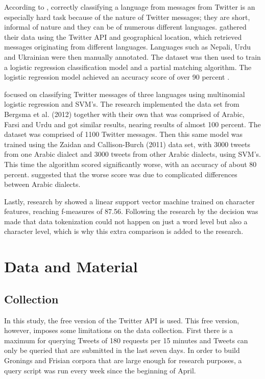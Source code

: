 \documentclass[
10pt, %
a4paper, %
oneside, %
headinclude,footinclude, %
] {book}%
\begin{document}
According to \citet{bergsma}, correctly classifying a language from messages from Twitter is an especially hard task because of the nature of Twitter messages; they are short, informal of nature and they can be of numerous different languages. \citet{bergsma} gathered their data using the Twitter API and geographical location, which retrieved messages originating from different languages. Languages such as Nepali, Urdu and Ukrainian were then manually annotated. The dataset was then used to train a logistic regression classification model and a partial matching algorithm. The logistic regression model achieved an accuracy score of over 90 percent \citep{bergsma}.

\citet{Tratz} focused on classifying Twitter messages of three languages using multinomial logistic regression and SVM's. The research implemented the data set from Bergsma et al. (2012) together with their own that was comprised of Arabic, Farsi and Urdu and got similar results, nearing results of almost 100 percent. The dataset was comprised of 1100 Twitter messages. Then this same model was trained using the Zaidan and Callison-Burch (2011) data set, with 3000 tweets from one Arabic dialect and 3000 tweets from other Arabic dialects, using SVM's. This time the algorithm scored significantly worse, with an accuracy of about 80 percent. \citet{Tratz} suggested that the worse score was due to complicated differences between Arabic dialects.

Lastly, research by \citet{Wieling} showed a linear support vector machine trained on character features, reaching f-measures of 87.56. Following the research by \citet{Wieling} the decision was made that data tokenization could not happen on just a word level but also a character level, which is why this extra comparison is added to the research.


\chapter{Data and Material}

\section{Collection} 
In this study,  the free version of the Twitter API is used. This free version, however, imposes some limitations on the data collection. First there is a maximum for querying Tweets of 180 requests per 15 minutes and Tweets can only be queried that are submitted in the last seven days. In order to build Gronings and Frisian corpora that are large enough for research purposes, a query script was run every week since the beginning of April. \\
\end{document}
